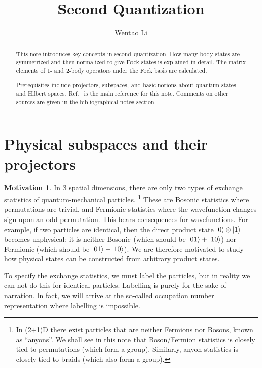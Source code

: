 \documentclass{article}
\author{Wentao Li}
\theoremstyle{definition}
\newtheorem{mot}{Motivation}[section]
\theoremstyle{plain}
\numberwithin{equation}{section}
\begin{document}
    
\title{Second Quantization}

\maketitle

\begin{abstract}
    This note introduces key concepts in second quantization. 
    How many-body states are symmetrized and then normalized 
    to give Fock states is explained in detail. 
    The matrix elements of 1- and 2-body operators 
    under the Fock basis are calculated. 

    Prerequisites include projectors, subspaces, and 
    basic notions about quantum states and Hilbert spaces. 
    Ref.~\cite[][\S 1.2]{dupuis_field_2023} 
    is the main reference for this note. 
    Comments on other sources are given in the bibliographical notes section. 
\end{abstract}

\tableofcontents
\section{Physical subspaces and their projectors}
\begin{mot}
In 3 spatial dimensions, there are only two types of 
exchange statistics of quantum-mechanical particles. 
\footnote{
In (2+1)D there exist particles that are neither 
Fermions nor Bosons, known as ``anyons''. We shall see 
in this note that Boson/Fermion statistics is closely tied 
to permutations (which form a group). 
Similarly, anyon statistics is closely tied to braids (which also form a group).
}
These are Bosonic statistics where permutations are trivial, 
and Fermionic statistics where the wavefunction changes sign 
upon an odd permutation. 
This bears consequences for wavefunctions. 
For example, if two particles are identical, 
then the direct product state $\ket{0}\otimes \ket{1}$ becomes 
unphysical: it is neither Bosonic 
(which should be $\ket{01}+\ket{10}$) 
nor Fermionic 
(which should be $\ket{01}-\ket{10}$). 
We are therefore motivated to study how physical 
states can be constructed from arbitrary product states.
\end{mot}

To specify the 
exchange statistics, we must label the particles, but in reality 
we can not do this for identical particles. 
Labelling is purely for the sake of narration. In fact, 
we will arrive at the so-called occupation number representation 
where labelling is impossible.
\end{document}
